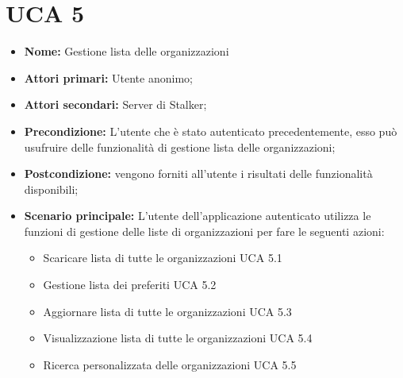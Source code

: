 \section{UCA 5}%
\begin{itemize}
\item \textbf{Nome:} Gestione lista delle organizzazioni
\item \textbf{Attori primari:} Utente anonimo;
\item \textbf{Attori secondari:} Server di Stalker;
\item \textbf{Precondizione:} L’utente che è stato autenticato precedentemente, esso può usufruire delle funzionalità di gestione lista delle organizzazioni;
\item \textbf{Postcondizione:} vengono forniti all’utente i risultati delle funzionalità disponibili;
\item \textbf{Scenario principale:} L’utente dell’applicazione autenticato utilizza le funzioni di gestione delle liste di organizzazioni per fare le seguenti azioni:
	\begin{itemize}
		\item Scaricare lista di tutte le organizzazioni UCA 5.1
		\item Gestione lista dei preferiti UCA 5.2
		\item Aggiornare lista di tutte le organizzazioni UCA 5.3
		\item Visualizzazione lista di tutte le organizzazioni UCA 5.4
		\item Ricerca personalizzata delle organizzazioni UCA 5.5
	\end{itemize}
\end{itemize}

